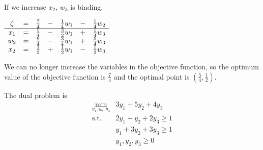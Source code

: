 \documentclass[letterpaper,12pt]{article}
\begin{document}
If we increase $x_2$, $w_3$ is binding. \\

\begin{center}
	$\begin{array}{ c c c c c c c c  }
	\zeta & = & \frac{7}{4} & - & \frac{1}{4}w_1 & - & \frac{1}{4}w_2 \\
	\hline
	x_1 & = & \frac{5}{4} & - & \frac{3}{2}w_1 & + & \frac{1}{4}w_3 \\
	w_2 & = & \frac{9}{4} & - & \frac{3}{4}w_1 & + & \frac{5}{4}w_3 \\
	x_2 & = & \frac{1}{2} & + & \frac{1}{2}w_1 & - & \frac{1}{2}w_3 \\
	\end{array}$ \\
\end{center}

We can no longer increase the variables in the objective function, so the optimum value of the objective function is $\frac{7}{4}$ and the optimal point is $(\frac{5}{4}, \frac{1}{2})$.

The dual problem is
\begin{align*}
\min_{y_1, y_2, y_3} & 3y_1 + 5y_2 + 4y_3 \\
\text{s.t.} \ & 2y_1 + y_2 + 2y_3 \geq 1 \\
&y_1 + 3 y_2 + 3y_3 \geq 1 \\
& y_1, y_2, y_3 \geq 0
\end{align*}
\end{document}
